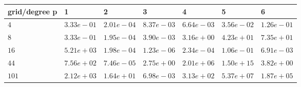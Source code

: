 \begin{tabular}{lllllll}
\hline
 grid/degree p   & 1          & 2          & 3          & 4          & 5          & 6          \\
\hline
 $4$             & $3.33e-01$ & $2.01e-04$ & $8.37e-03$ & $6.64e-03$ & $3.56e-02$ & $1.26e-01$ \\
 $8$             & $3.33e-01$ & $1.95e-04$ & $3.90e-03$ & $3.16e+00$ & $4.23e+01$ & $7.35e+01$ \\
 $16$            & $5.21e+03$ & $1.98e-04$ & $1.23e-06$ & $2.34e-04$ & $1.06e-01$ & $6.91e-03$ \\
 $44$            & $7.56e+02$ & $7.46e-05$ & $2.75e+00$ & $2.01e+06$ & $1.50e+15$ & $3.82e+00$ \\
 $101$           & $2.12e+03$ & $1.64e+01$ & $6.98e-03$ & $3.13e+02$ & $5.37e+07$ & $1.87e+05$ \\
\hline
\end{tabular}